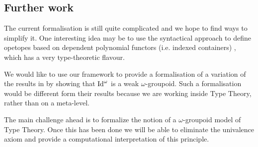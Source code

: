 \subsection{Further work}
The current formalisation is still
quite complicated and we hope to find ways to simplify it. One interesting
idea may be to use the syntactical approach to define opetopes based on
dependent polynomial functors (i.e. indexed containers) \cite{opetopes},
which has a very type-theoretic flavour.  

We would like to use our framework to provide a formalisation of a
variation of the results in
\cite{lumsdaine10:weak-o-categories,berg08:types-are} by showing that
$\mathrm{Id}^\omega$ is a weak $\omega$-groupoid. Such a formalisation would be different form
their results because we are working inside Type Theory, rather than on
a meta-level.

The main challenge ahead is to formalize the notion of a
$\omega$-groupoid model of Type Theory. Once this has been done we
will be able to eliminate the univalence axiom and provide a
computational interpretation of this principle.





